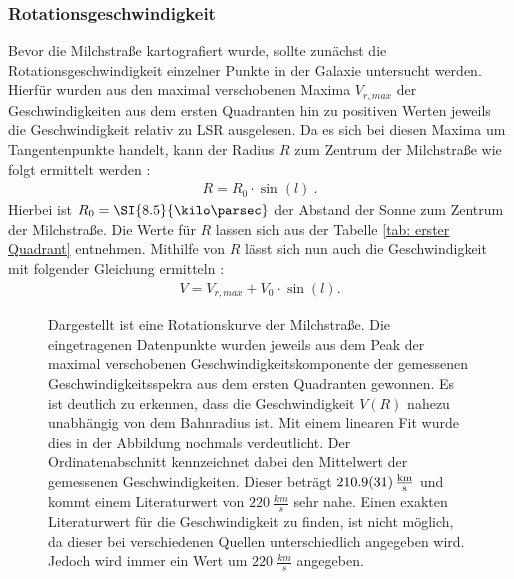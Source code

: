 \subsubsection{Rotationsgeschwindigkeit}
Bevor die Milchstraße kartografiert wurde, sollte zunächst die Rotationsgeschwindigkeit einzelner Punkte in der Galaxie untersucht werden. Hierfür wurden aus den maximal verschobenen Maxima $V_{r,max}$ der Geschwindigkeiten aus dem ersten Quadranten hin zu positiven Werten jeweils die Geschwindigkeit relativ zu LSR ausgelesen. Da es sich bei diesen Maxima um Tangentenpunkte handelt, kann der Radius $R$ zum Zentrum der Milchstraße wie folgt ermittelt werden \cite{H1}:
\begin{align}
    R = R_0 \cdot \sin(l) \ .
    \label{eq:TangenteR}
\end{align}
Hierbei ist $R_0 = \SI{8.5}{\kilo \parsec}$ der Abstand der Sonne zum Zentrum der Milchstraße. Die Werte für $R$ lassen sich aus der Tabelle \ref{tab: erster Quadrant} entnehmen. Mithilfe von $R$ lässt sich nun auch die Geschwindigkeit mit folgender Gleichung ermitteln \cite{H1}:
\begin{align}
    V = V_{r,max} + V_0 \cdot \sin(l) .
    \label{eq:V(R)}
\end{align}

\begin{figure}[H]
    \centering
    \resizebox{0.8\textwidth}{!}{}
    \caption[Rotationskurve der Milchstraße]{Dargestellt ist eine Rotationskurve der Milchstraße. Die eingetragenen Datenpunkte wurden jeweils aus dem Peak der maximal verschobenen Geschwindigkeitskomponente der gemessenen Geschwindigkeitsspekra aus dem ersten Quadranten gewonnen. Es ist deutlich zu erkennen, dass die Geschwindigkeit $V(R)$ nahezu unabhängig von dem Bahnradius ist. Mit einem linearen Fit wurde dies in der Abbildung nochmals verdeutlicht. Der Ordinatenabschnitt kennzeichnet dabei den Mittelwert der gemessenen Geschwindigkeiten. Dieser beträgt $\SI{210.9 \pm 3.1}{\frac{km}{s}}$ und kommt einem Literaturwert von $\SI{220}{\frac{km}{s}}$ \cite{LSR} sehr nahe. Einen exakten Literaturwert für die Geschwindigkeit zu finden, ist nicht möglich, da dieser bei verschiedenen Quellen unterschiedlich angegeben wird. Jedoch wird immer ein Wert um $\SI{220}{\frac{km}{s}}$ angegeben.}
    \label{fig:VvonR}
\end{figure}

